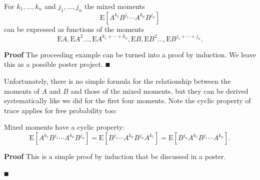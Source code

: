 \begin{lemma} For $k_1,\ensuremath{\ldots},k_n$ and $j_1,\ensuremath{\ldots},j_n$ the mixed moments
\[
\ensuremath{\bm{\mathrm{E}}}[A^{k_1} B^{j_1} \ensuremath{\cdots} A^{k_n} B^{j_n}]
\]
can be expressed as functions of the moments
\[
\ensuremath{\bm{\mathrm{E}}}A, \ensuremath{\bm{\mathrm{E}}} A^2 \ensuremath{\ldots}, \ensuremath{\bm{\mathrm{E}}}A^{k_1 + \ensuremath{\cdots} + k_n}, \ensuremath{\bm{\mathrm{E}}}B, \ensuremath{\bm{\mathrm{E}}}B^2  \ensuremath{\ldots}, \ensuremath{\bm{\mathrm{E}}}B^{j_1 + \ensuremath{\cdots} + j_n}.
\]
\end{lemma}
\textbf{Proof} The proceeding example can be turned into a proof by induction. We leave this as a possible poster project. \ensuremath{\QED}

Unfortunately, there is no simple formula for the relationship between the moments of $A$ and $B$ and those of the mixed moments, but they can be derived systematically like we did for the first four moments. Note the cyclic property of trace applies for free probability too:

\begin{lemma} Mixed moments have a cyclic property:
\[
\ensuremath{\bm{\mathrm{E}}}[A^{k_1} B^{j_1} \ensuremath{\cdots} A^{k_n} B^{j_n}] = \ensuremath{\bm{\mathrm{E}}}[ B^{j_1} \ensuremath{\cdots} A^{k_n} B^{j_n} A^{k_1}] = 
\ensuremath{\bm{\mathrm{E}}}[B^{j_n} A^{k_1} B^{j_1} \ensuremath{\cdots} A^{k_n}].
\]
\end{lemma}
\textbf{Proof}  This is a simple proof by induction that be discussed in a poster.

\ensuremath{\QED}

